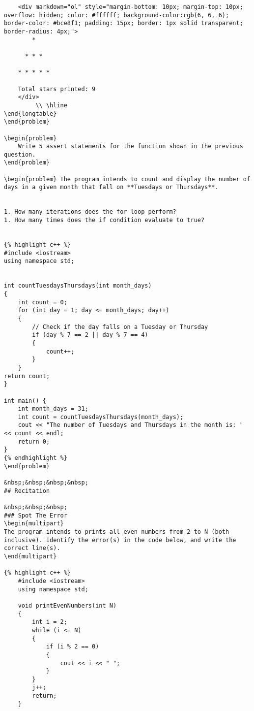 \begin{problem}
\begin{verbatim}
    <div markdown="ol" style="margin-bottom: 10px; margin-top: 10px; overflow: hidden; color: #ffffff; background-color:rgb(6, 6, 6); border-color: #bce8f1; padding: 15px; border: 1px solid transparent; border-radius: 4px;">
        * 
        
      * * * 
      
    * * * * * 
    
    Total stars printed: 9
    </div>
         \\ \hline
\end{longtable}
\end{problem}

\begin{problem}
    Write 5 assert statements for the function shown in the previous question.
\end{problem}

\begin{problem} The program intends to count and display the number of days in a given month that fall on **Tuesdays or Thursdays**.


1. How many iterations does the for loop perform?
1. How many times does the if condition evaluate to true?


{% highlight c++ %}
#include <iostream>
using namespace std;


int countTuesdaysThursdays(int month_days)
{
    int count = 0;
    for (int day = 1; day <= month_days; day++)
    {
        // Check if the day falls on a Tuesday or Thursday
        if (day % 7 == 2 || day % 7 == 4)
        {
            count++;
        }
    }
return count;
}

int main() {
    int month_days = 31;
    int count = countTuesdaysThursdays(month_days);
    cout << "The number of Tuesdays and Thursdays in the month is: " << count << endl;
    return 0;
}
{% endhighlight %}
\end{problem}

&nbsp;&nbsp;&nbsp;&nbsp;
## Recitation

&nbsp;&nbsp;&nbsp;
### Spot The Error
\begin{multipart}
The program intends to prints all even numbers from 2 to N (both inclusive). Identify the error(s) in the code below, and write the correct line(s).
\end{multipart}

{% highlight c++ %}
    #include <iostream>
    using namespace std;
    
    void printEvenNumbers(int N)
    {
        int i = 2;   
        while (i <= N)
        {
            if (i % 2 == 0)
            {
                cout << i << " ";
            }
        }
        j++;
        return;
    }
    

\end{verbatim}
\end{problem}

